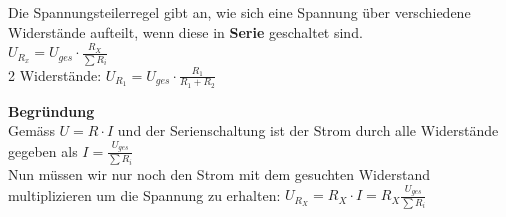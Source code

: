 \newpage



\begingl
Die Spannungsteilerregel gibt an, wie sich eine Spannung über verschiedene Widerstände aufteilt, wenn diese in \textbf{Serie} geschaltet sind. \\
\formulaBegin
$\displaystyle U_{R_x} = U_{ges} \cdot \frac{R_X}{\sum R_i}$
\\
2 Widerstände: $
U_{R_1}  = U_{ges} \cdot \frac{R_1}{R_1 + R_2}$
\formulaEnd

\begin{center}
\end{center}
\iend


\textbf{Begründung} \\
Gemäss $\displaystyle U = R \cdot I $ und der Serienschaltung ist der Strom durch alle Widerstände gegeben als $\displaystyle I = \frac{U_{ges}}{\sum R_i} $ \\
Nun müssen wir nur noch den Strom mit dem gesuchten Widerstand multiplizieren um die Spannung zu erhalten: $\displaystyle U_{R_X} = R_X \cdot I = R_X \frac{U_{ges}}{\sum R_i} $

